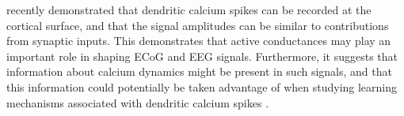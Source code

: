 \documentclass[preprint,10pt,authoryear]{elsarticle}
\newcommand{\hlb}[2][NavyBlue]{ {\sethlcolor{#1} \hl{#2}} }
\newcommand{\hlg}[2][Emerald]{ {\sethlcolor{#1} \hl{#2}} }
\newcommand{\snnote}[1]{\color{white}{\hlb{SN: #1 }}\color{black}}
\newcommand{\sntxt}[1]{{\color{NavyBlue}#1}}
\newcommand{\tvnnote}[1]{\color{white}{\hlg{TVN: #1 }}\color{black}}
\newcommand{\tvntxt}[1]{{\color{Emerald}#1}}
\begin{document}
%

\cite{SUZUKI2017} recently demonstrated that dendritic calcium spikes can be recorded at the cortical surface, and that the signal amplitudes can be similar to contributions from synaptic inputs.
This demonstrates that active conductances may play an important role in shaping ECoG and EEG signals. Furthermore, it suggests that information about calcium dynamics might be present in such signals, and that this information could potentially be taken advantage of when studying learning mechanisms associated with dendritic calcium spikes \citep{SUZUKI2017}.
\end{document}
